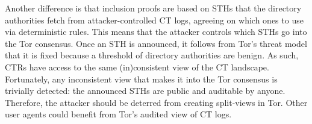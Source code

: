Another difference is that inclusion proofs are based on STHs that the directory
authorities fetch from attacker-controlled CT logs, agreeing on which ones to
use via deterministic rules.  This means that the attacker controls which STHs
go into the Tor consensus.  Once an STH is announced, it follows from Tor's
threat model that it is fixed because a threshold of directory authorities are
benign.  As such, CTRs have access to the same (in)consistent view of the CT
landscape.  Fortunately, any inconsistent view that makes it into the Tor
consensus is trivially detected:
	the announced STHs are public and auditable by anyone.
Therefore, the attacker should be deterred from creating split-views in Tor.
Other user agents could benefit from Tor's audited view of CT logs.

